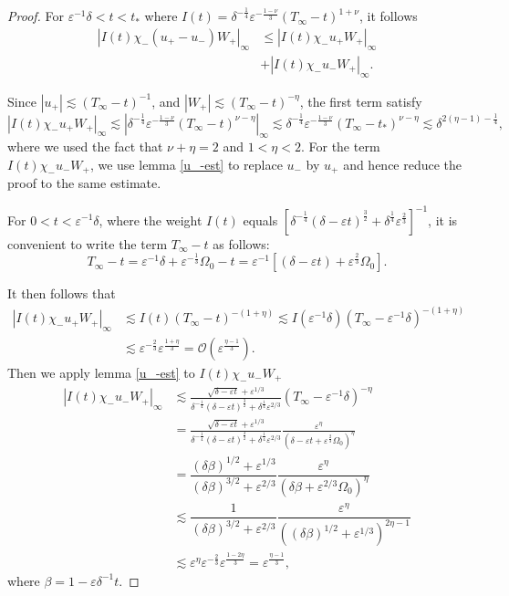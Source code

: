 \documentclass[letterpaper,11pt]{article}
\newcommand{\rmO}{\mathcal{O}}
\newcommand{\eps}{\varepsilon}
\newcommand{\lar}{ \lesssim }
\numberwithin{equation}{section}
\theoremstyle{plain}
\begin{document}
\begin{enumerate}
\begin{itemize}
\begin{enumerate}
\begin{proof}
For $\eps^{-1}\delta<t<t_*$ where $I(t) = \delta^{-\frac{1}{4}}\eps^{-\frac{1-\nu}{3}} (T_\infty - t)^{1+\nu}$, it follows
\begin{align*}
|I(t)  \chi_-(u_+ - u_-)W_+|_\infty &\le |I(t) \chi_-u_+ W_+|_\infty\\
&+|I(t) \chi_-u_- W_+|_\infty.
\end{align*}
 
Since $|u_+| \lar (T_\infty -t)^{-1}$, and $|W_+| \lar (T_\infty-t)^{-\eta}$, the first term satisfy
\[
|I(t)\chi_-u_+ W_+|_\infty \lar |\delta^{-\frac{1}{4}}\eps^{-\frac{1-\nu}{3}} (T_\infty-t)^{\nu - \eta} |_\infty \lar \delta^{-\frac{1}{4}}\eps^{-\frac{1-\nu}{3}} (T_\infty-t_*)^{\nu - \eta} \lar \delta^{2(\eta-1)-\frac{1}{4}},
\]
where we used the fact that $\nu+\eta =2 $ and $1<\eta<2$. For the term $I(t)\chi_-u_-W_+$, we use lemma \ref{u_-est} to replace $u_-$ by $u_+$ and hence reduce the proof to the same estimate.


For $0<t<\eps^{-1}\delta$, where the weight $I(t) $ equals $[\delta^{-\frac{1}{4}} (\delta -\eps t)^{\frac{3}{2}}+\delta^{\frac{1}{4}}\eps^{\frac{2}{3}}]^{-1}$, it is convenient to write the term $T_\infty -t$ as follows:
\[
T_\infty -t = \eps^{-1}\delta + \eps^{-\frac{1}{3}}\Omega_0 - t  = \eps^{-1}\left[(\delta -\eps t) +\eps^{\frac{2}{3}}\Omega_0\right].
\]

It then follows that
\begin{align*}
|I(t)\chi_- u_+ W_+|_\infty &\lar I(t)(T_\infty - t)^{-(1+\eta)} \lar I(\eps^{-1}\delta)(T_\infty - \eps^{-1}\delta)^{-(1+\eta)} \\
&\lar \eps^{-\frac{2}{3}} \eps^{\frac{1+\eta}{3}} = \rmO(\eps^{\frac{\eta-1}{3}} ).
\end{align*}
Then we apply lemma \ref{u_-est} to $I(t)\chi_-u_-W_+$
\begin{align*}
|I(t)\chi_- u_- W_+|_\infty  &\lar \frac{\sqrt{\delta-\eps t}+\eps^{1/3}}{ \delta^{-\frac{1}{4}}(\delta-\eps t)^{\frac{3}{2}} + \delta^{\frac{1}{4}}\eps^{2/3}} (T_\infty - \eps^{-1}\delta)^{-\eta} \\
& = \frac{\sqrt{\delta-\eps t}+\eps^{1/3}}{ \delta^{-\frac{1}{4}}(\delta-\eps t)^{\frac{3}{2}} + \delta^{\frac{1}{4}}\eps^{2/3}} \frac{\eps^{\eta}}{(\delta -\eps t +\eps^{\frac{2}{3}}\Omega_0)^\eta}\\
&= \dfrac{(\delta \beta)^{1/2} + \eps^{1/3}} {(\delta \beta)^{3/2} + \eps^{2/3}} \dfrac{\eps^\eta}{(\delta \beta + \eps^{2/3} \Omega_0 )^{\eta} }\\
& \lar \dfrac{1} {(\delta \beta)^{3/2} + \eps^{2/3}} \dfrac{\eps^\eta}{( (\delta \beta)^{1/2} + \eps^{1/3} )^{2\eta -1} } \\
& \lar \eps^{\eta}\eps^{-\frac{2}{3}}\eps^{\frac{1-2\eta}{3}} = \eps^{\frac{\eta-1}{3}},
\end{align*}
where $\beta = 1-\eps \delta^{-1}t$.
\end{proof}





\end{enumerate}
\end{itemize}
\end{enumerate}
\end{document}
